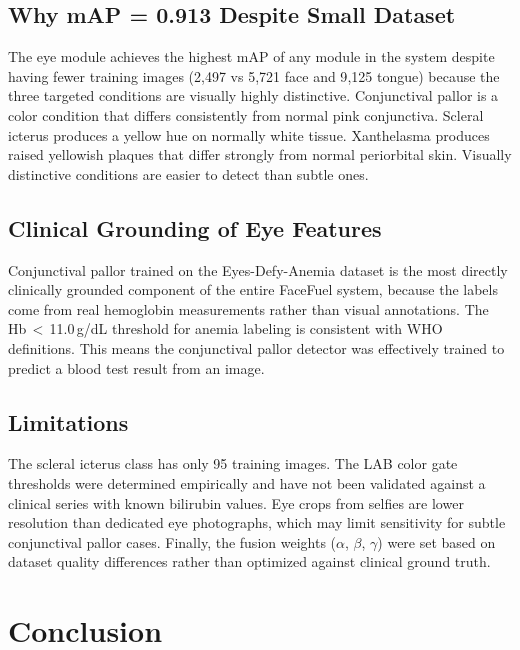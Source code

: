 \documentclass[journal]{IEEEtran}
\begin{document}
\subsection{Why mAP = 0.913 Despite Small Dataset}

The eye module achieves the highest mAP of any module in the system
despite having fewer training images (2{,}497 vs 5{,}721 face and
9{,}125 tongue) because the three targeted conditions are visually
highly distinctive. Conjunctival pallor is a color condition that
differs consistently from normal pink conjunctiva. Scleral icterus
produces a yellow hue on normally white tissue. Xanthelasma produces
raised yellowish plaques that differ strongly from normal periorbital
skin. Visually distinctive conditions are easier to detect than subtle
ones.

\subsection{Clinical Grounding of Eye Features}

Conjunctival pallor trained on the Eyes-Defy-Anemia dataset is the most
directly clinically grounded component of the entire FaceFuel system,
because the labels come from real hemoglobin measurements rather than
visual annotations. The Hb\,$<$\,11.0\,g/dL threshold for anemia labeling
is consistent with WHO definitions. This means the conjunctival pallor
detector was effectively trained to predict a blood test result from an image.

\subsection{Limitations}

The scleral icterus class has only 95 training images. The LAB color
gate thresholds were determined empirically and have not been validated
against a clinical series with known bilirubin values. Eye crops from
selfies are lower resolution than dedicated eye photographs, which may
limit sensitivity for subtle conjunctival pallor cases. Finally, the
fusion weights ($\alpha$, $\beta$, $\gamma$) were set based on dataset
quality differences rather than optimized against clinical ground truth.

\section{Conclusion}
\label{sec:conclusion}
\end{document}
